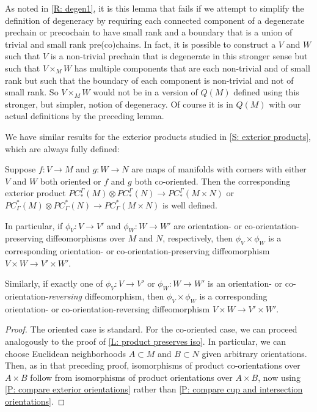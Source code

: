 \begin{remark}\label{R: degen2}
	As noted in \cref{R: degen1}, it is this lemma that fails if we attempt to simplify the definition of degeneracy by requiring each connected component of a degenerate prechain or precochain to have small rank and a boundary that is a union of trivial and small rank pre(co)chains.
	In fact, it is possible to construct a $V$ and $W$ such that $V$ is a non-trivial prechain that is degenerate in this stronger sense but such that $V \times_M W$ has multiple components that are each non-trivial and of small rank but such that the boundary of each component is non-trivial and not of small rank.
	So $V \times_M W$ would not be in a version of $Q(M)$ defined using this stronger, but simpler, notion of degeneracy.
	Of course it is in $Q(M)$ with our actual definitions by the preceding lemma.
\end{remark}

We have similar results for the exterior products studied in \cref{S: exterior products}, which are always fully defined:


\begin{lemma}\label{L: ext product preserves iso}
	Suppose $f \colon V \to M$ and $g \colon W \to N$ are maps of manifolds with corners with either $V$ and $W$ both oriented or $f$ and $g$ both co-oriented.
	Then the corresponding exterior product $PC_*^\Gamma(M) \otimes PC_*^\Gamma(N) \to PC_*^\Gamma(M \times N)$ or $PC^*_\Gamma(M) \otimes PC^*_\Gamma(N) \to PC^*_\Gamma(M \times N)$ is well defined.

	In particular, if $\phi_V \colon V \to V'$ and $\phi_W \colon W \to W'$ are orientation- or co-orientation-preserving diffeomorphisms over $M$ and $N$, respectively, then $\phi_V \times \phi_W$ is a corresponding orientation- or co-orientation-preserving diffeomorphism $V \times W \to V' \times W'$.

	Similarly, if exactly one of $\phi_V \colon V \to V'$ or $\phi_W \colon W \to W'$ is an orientation- or co-orientation-\textit{reversing} diffeomorphism, then $\phi_V \times \phi_W$ is a corresponding orientation- or co-orientation-reversing diffeomorphism $V \times W \to V' \times W'$.
\end{lemma}
\begin{proof}
	The oriented case is standard. For the co-oriented case, we can proceed analogously to the proof of \cref{L: product preserves iso}.
	In particular, we can choose Euclidean neighborhoods $A \subset M$ and $B \subset N$ given arbitrary orientations.
	Then, as in that preceding proof, isomorphisms of product co-orientations over $A \times B$ follow from isomorphisms of product orientations over $A \times B$, now using \cref{P: compare exterior orientations} rather than \cref{P: compare cup and intersection orientations}.
\end{proof}


